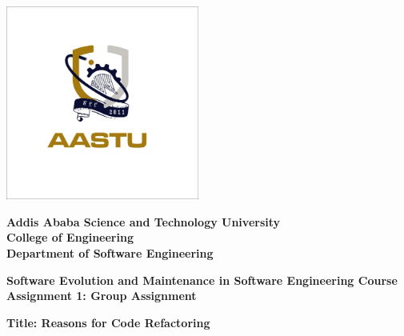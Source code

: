 \documentclass[12pt]{article}
\begin{document}
\begin{center} %

    \includegraphics[width=2.5in]{aastu.png} 
    \vspace{1em} %

    {\huge\bfseries\color{aastu_blue} Addis Ababa Science and Technology University}\\[0.5em]
    {\Large\bfseries College of Engineering}\\[0.3em]
    {\Large\bfseries Department of Software Engineering}
    \vspace{2.5em} %

    {\large\bfseries Software Evolution and Maintenance in Software Engineering Course}\\[0.3em]
    {\large\bfseries Assignment 1: Group Assignment}
    \vspace{2.5em} %

    {\LARGE\bfseries Title: Reasons for Code Refactoring}
    \vspace{3em} %

\end{center} %
\end{document}

